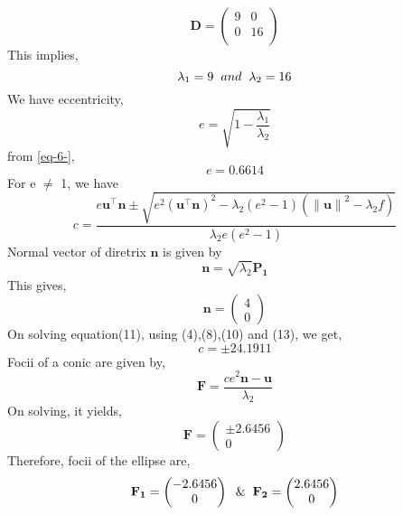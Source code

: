 \documentclass[journal,10pt,twocolumn]{article}
\providecommand{\norm}[1]{\left\lVert#1\right\rVert}
\let\vec\mathbf
\newcommand{\myvec}[1]{\ensuremath{\begin{pmatrix}#1\end{pmatrix}}}
\providecommand{\brak}[1]{\ensuremath{\left(#1\right)}}
\begin{document}
\begin{equation}
\vec{D} = \begin{pmatrix} 
	9 & 0 \\
	0 & 16 \\
	\end{pmatrix}
\label{eq-5-}
\end{equation}
This implies,
\begin{equation}
\lambda_1 = 9 \hspace{2mm} and \hspace{2mm} \lambda_2 = 16
\label{eq-6-}
\end{equation}
We have eccentricity,
\begin{equation}
e = \sqrt{1-\frac{\lambda_1}{\lambda_2}}
\label{eq-7-}
\end{equation}
from \eqref{eq-6-},
\begin{equation}
e = 0.6614
\label{eq-8-}
\end{equation}
For e $\neq$ 1, we have
\begin{equation}
c = \frac{e\vec{u}^{\top} \vec{n}\pm \sqrt{e^2\brak{\vec{u}^{\top}\vec{n}}^2 - \lambda_2 \brak{e^2-1}\brak{\norm{\vec{u}}^2-\lambda_2 f }}}{\lambda_2 e \brak{e^2-1}}
\label{eq-11-}
\end{equation}
Normal vector of diretrix $\vec{n}$ is given by
\begin{equation}
\vec{n} = \sqrt{\lambda_2}\vec{P_1}
\label{eq-9-}
\end{equation}
This gives,
\begin{equation}
\vec{n} = \myvec{4 \\ 0}
\label{eq-10-}
\end{equation}
On solving equation(11), using (4),(8),(10) and (13), we get,
\begin{equation}
c = \pm 24.1911
\label{eq-12-}
\end{equation}
Focii of a conic are given by,
\begin{equation}
\vec{F} = \frac{ce^2\vec{n}-\vec{u}}{\lambda_2}
\label{eq-13-}
\end{equation}
On solving, it yields,
\begin{equation}
\vec{F} = \myvec{\pm 2.6456\\0}
\label{eq-14-}
\end{equation}
Therefore, focii of the ellipse are,
\begin{equation}
\vec{F_1} = \myvec{-2.6456 \\ 0} \hspace{2mm} \& \hspace{2mm} \vec{F_2} = \myvec{2.6456 \\ 0}
\label{eq-15-}
\end{equation}
\end{document}
